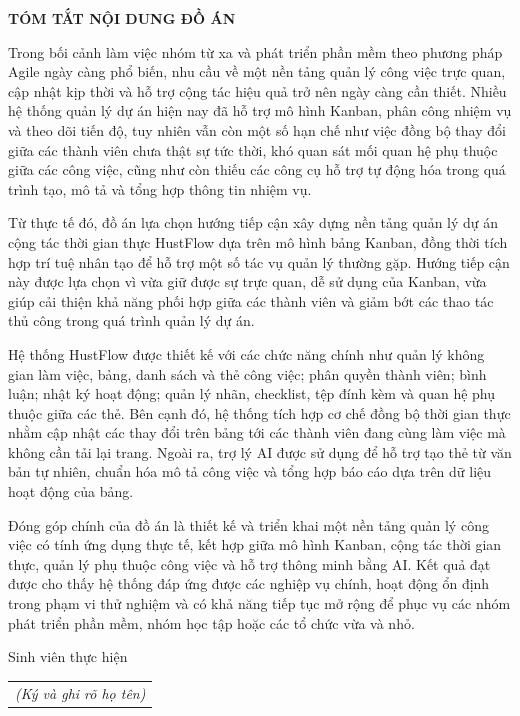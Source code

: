 \documentclass[../DoAn.tex]{subfiles}
\begin{document}
\begin{center}
    \Large{\textbf{TÓM TẮT NỘI DUNG ĐỒ ÁN}}\\
\end{center}
\vspace{1cm}
\hspace*{13pt} Trong bối cảnh làm việc nhóm từ xa và phát triển phần mềm theo phương pháp Agile ngày càng phổ biến, nhu cầu về một nền tảng quản lý công việc trực quan, cập nhật kịp thời và hỗ trợ cộng tác hiệu quả trở nên ngày càng cần thiết. Nhiều hệ thống quản lý dự án hiện nay đã hỗ trợ mô hình Kanban, phân công nhiệm vụ và theo dõi tiến độ, tuy nhiên vẫn còn một số hạn chế như việc đồng bộ thay đổi giữa các thành viên chưa thật sự tức thời, khó quan sát mối quan hệ phụ thuộc giữa các công việc, cũng như còn thiếu các công cụ hỗ trợ tự động hóa trong quá trình tạo, mô tả và tổng hợp thông tin nhiệm vụ.

Từ thực tế đó, đồ án lựa chọn hướng tiếp cận xây dựng nền tảng quản lý dự án cộng tác thời gian thực HustFlow dựa trên mô hình bảng Kanban, đồng thời tích hợp trí tuệ nhân tạo để hỗ trợ một số tác vụ quản lý thường gặp. Hướng tiếp cận này được lựa chọn vì vừa giữ được sự trực quan, dễ sử dụng của Kanban, vừa giúp cải thiện khả năng phối hợp giữa các thành viên và giảm bớt các thao tác thủ công trong quá trình quản lý dự án.

Hệ thống HustFlow được thiết kế với các chức năng chính như quản lý không gian làm việc, bảng, danh sách và thẻ công việc; phân quyền thành viên; bình luận; nhật ký hoạt động; quản lý nhãn, checklist, tệp đính kèm và quan hệ phụ thuộc giữa các thẻ. Bên cạnh đó, hệ thống tích hợp cơ chế đồng bộ thời gian thực nhằm cập nhật các thay đổi trên bảng tới các thành viên đang cùng làm việc mà không cần tải lại trang. Ngoài ra, trợ lý AI được sử dụng để hỗ trợ tạo thẻ từ văn bản tự nhiên, chuẩn hóa mô tả công việc và tổng hợp báo cáo dựa trên dữ liệu hoạt động của bảng.

Đóng góp chính của đồ án là thiết kế và triển khai một nền tảng quản lý công việc có tính ứng dụng thực tế, kết hợp giữa mô hình Kanban, cộng tác thời gian thực, quản lý phụ thuộc công việc và hỗ trợ thông minh bằng AI. Kết quả đạt được cho thấy hệ thống đáp ứng được các nghiệp vụ chính, hoạt động ổn định trong phạm vi thử nghiệm và có khả năng tiếp tục mở rộng để phục vụ các nhóm phát triển phần mềm, nhóm học tập hoặc các tổ chức vừa và nhỏ.

\begin{flushright}
Sinh viên thực hiện\\
\begin{tabular}{@{}c@{}}
\textit{(Ký và ghi rõ họ tên)}
\end{tabular}
\end{flushright}
\end{document}
